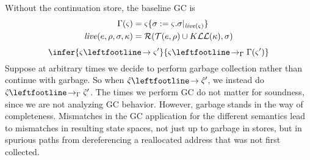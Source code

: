 Without the continuation store, the baseline GC is
\begin{align*}
  \Gamma(\varsigma) &= \varsigma\{ \sigma:=\varsigma.\sigma|_{\mathit{live}(\varsigma)} \} \\
  \mathit{live}(e,\rho,\sigma,\kappa) &= {\mathcal R}({\mathcal T}(e,\rho)\cup K{\mathcal L}{\mathcal L}(\kappa), \sigma)
\end{align*}
\begin{equation*}
  \infer{\mstate \stepto \mstate'}
        {\mstate \stepto_{\Gamma} \Gamma(\mstate')}  
\end{equation*}
Suppose at arbitrary times we decide to perform garbage collection rather than continue with garbage.
%
So when $\mastate \stepto \mastate'$, we instead do $\mastate \stepto_\Gamma \mastate'$.
%
The times we perform GC do not matter for soundness, since we are not analyzing GC behavior.
%
However, garbage stands in the way of completeness.
%
Mismatches in the GC application for the different semantics lead to mismatches in resulting state spaces, not just up to garbage in stores, but in spurious paths from dereferencing a reallocated address that was not first collected.
%

